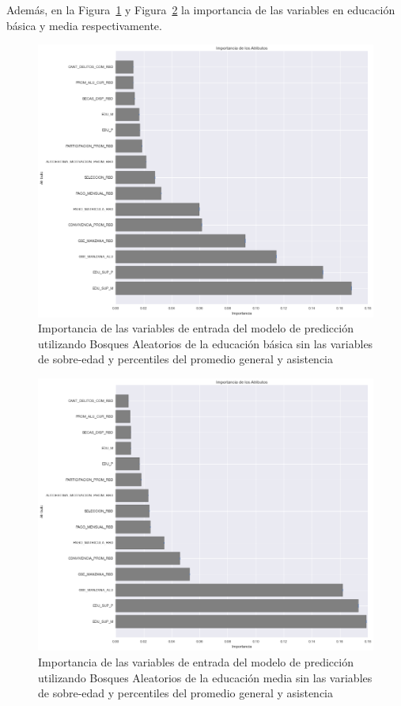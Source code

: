 Además, en la Figura~\ref{fig:impo-basica} y Figura~\ref{fig:impo-media} la importancia de las variables en educación básica y media respectivamente.

\begin{figure}[H]
  \centering
    \includegraphics[trim=0cm 0cm 0cm 0cm,scale=0.4]{Figuras/7AnalisisResultado/impo-basica.png}
      \caption{Importancia de las variables de entrada del modelo de predicción utilizando Bosques Aleatorios de la educación básica sin las variables de sobre-edad y percentiles del promedio general y asistencia}
    \label{fig:impo-basica}
\end{figure}

\begin{figure}[H]
  \centering
    \includegraphics[trim=0cm 0cm 0cm 0cm,scale=0.4]{Figuras/7AnalisisResultado/impo-media.png}
      \caption{Importancia de las variables de entrada del modelo de predicción utilizando Bosques Aleatorios de la educación media sin las variables de sobre-edad y percentiles del promedio general y asistencia}
    \label{fig:impo-media}
\end{figure}